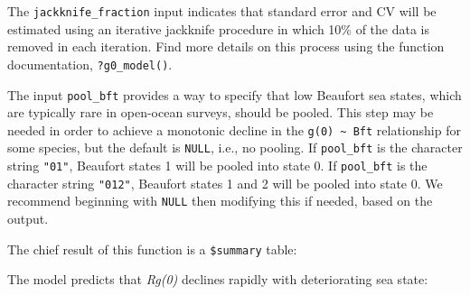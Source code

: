 \documentclass[
]{book}
\newenvironment{Shaded}{\begin{snugshade}}{\end{snugshade}}
\newcommand{\DecValTok}[1]{\textcolor[rgb]{0.00,0.00,0.81}{#1}}
\newcommand{\FloatTok}[1]{\textcolor[rgb]{0.00,0.00,0.81}{#1}}
\newcommand{\NormalTok}[1]{#1}
\newcommand{\OperatorTok}[1]{\textcolor[rgb]{0.81,0.36,0.00}{\textbf{#1}}}
\begin{document}
The \texttt{jackknife\_fraction} input indicates that standard error and CV will be estimated using an iterative jackknife procedure in which 10\% of the data is removed in each iteration. Find more details on this process using the function documentation, \texttt{?g0\_model()}.

The input \texttt{pool\_bft} provides a way to specify that low Beaufort sea states, which are typically rare in open-ocean surveys, should be pooled. This step may be needed in order to achieve a monotonic decline in the \texttt{g(0)\ \textasciitilde{}\ Bft} relationship for some species, but the default is \texttt{NULL}, i.e., no pooling. If \texttt{pool\_bft} is the character string \texttt{"01"}, Beaufort states 1 will be pooled into state 0. If \texttt{pool\_bft} is the character string \texttt{"012"}, Beaufort states 1 and 2 will be pooled into state 0. We recommend beginning with \texttt{NULL} then modifying this if needed, based on the output.

The chief result of this function is a \texttt{\$summary} table:

\begin{Shaded}
\end{Shaded}

The model predicts that \emph{Rg(0)} declines rapidly with deteriorating sea state:
\end{document}
